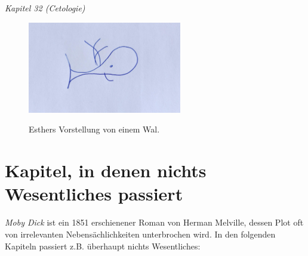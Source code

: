 \documentclass[a5paper,9pt,twoside=false]{extbook}
\begin{document}
\medskip

\noindent\footnotesize{\textit{Kapitel 32 (Cetologie)}}

\normalsize

\begin{figure}[h]
{ \centering
\includegraphics[width=0.6\textwidth]{esthers_wal.jpg} \\
} \caption{Esthers Vorstellung von einem Wal.}
\end{figure}


\newpage
\section*{Kapitel, in denen nichts Wesentliches passiert}\label{irrelevantes}
\textit{Moby Dick} ist ein 1851 erschienener Roman von Herman Melville, dessen Plot oft von irrelevanten Nebensächlichkeiten unterbrochen wird. In den folgenden Kapiteln passiert z.B. überhaupt nichts Wesentliches:
\footnotesize

\bigskip
\end{document}
